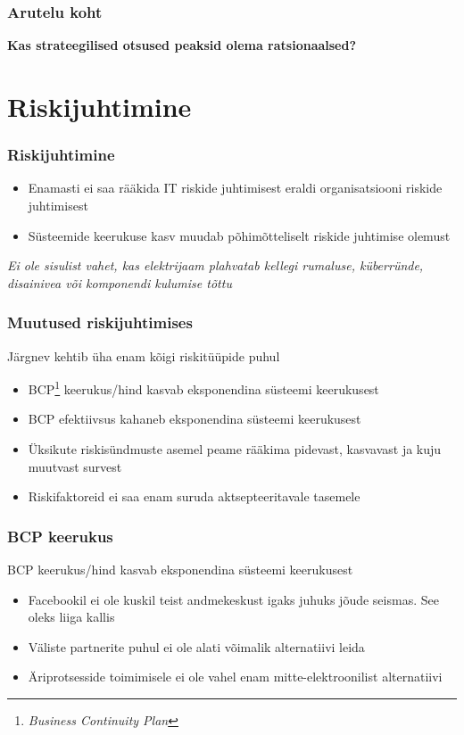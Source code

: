 \begin{frame}[fragile]
  \frametitle{Arutelu koht}
		\begin{center}
			\textbf{Kas strateegilised otsused peaksid olema ratsionaalsed?}
		\end{center}
\end{frame}

\section{Riskijuhtimine}

\begin{frame}[fragile]
  \frametitle{Riskijuhtimine}
	
	\begin{itemize}
		\item Enamasti ei saa rääkida IT riskide juhtimisest eraldi organisatsiooni riskide juhtimisest
		\item Süsteemide keerukuse kasv muudab põhimõtteliselt riskide juhtimise olemust
	\end{itemize}

	\begin{center}
		\emph{Ei ole sisulist vahet, kas elektrijaam plahvatab kellegi rumaluse, küberründe, disainivea või komponendi kulumise tõttu}
	\end{center}
\end{frame}

\begin{frame}[fragile]
  \frametitle{Muutused riskijuhtimises}
	Järgnev kehtib üha enam kõigi riskitüüpide puhul
	\begin{itemize}
		\item BCP\footnote{\emph{Business Continuity Plan}} keerukus/hind kasvab eksponendina süsteemi keerukusest
		\item BCP efektiivsus kahaneb eksponendina süsteemi keerukusest
		\item Üksikute riskisündmuste asemel peame rääkima pidevast, kasvavast ja kuju muutvast survest
		\item Riskifaktoreid ei saa enam suruda aktsepteeritavale tasemele
	\end{itemize}
\end{frame}

\iffalse
\begin{frame}[fragile]
  \frametitle{BCP keerukus}
	BCP keerukus/hind kasvab eksponendina süsteemi keerukusest
	\begin{itemize}
		\item Facebookil ei ole kuskil teist andmekeskust igaks juhuks jõude seismas. See oleks liiga kallis
		\item Väliste partnerite puhul ei ole alati võimalik alternatiivi leida
		\item Äriprotsesside toimimisele ei ole vahel enam mitte-elektroonilist alternatiivi
	\end{itemize}
\end{frame}

